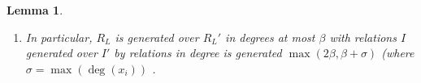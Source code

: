 \documentclass{amsart}
\theoremstyle{plain}
\newtheorem{lem}[thm]{Lemma}
\theoremstyle{definition}
\theoremstyle{remark}
\numberwithin{equation}{section}
\newcommand \halfcan{L}
\newcommand \initial{\text{in}}
\newcommand \gin{\text{gin}}
\begin{document}
\begin{lem}
\begin{enumerate}
\item[(c)] In particular, $R_\halfcan$ is generated over $R_\halfcan'$ in degrees at most $\beta$ with relations $I$ generated over $I'$ by relations in degree is generated $\max(2\beta, \beta + \sigma)$ {\rm(}where $\sigma=\max(\deg(x_i))$ .
\end{enumerate}
\end{lem}
\end{document}
